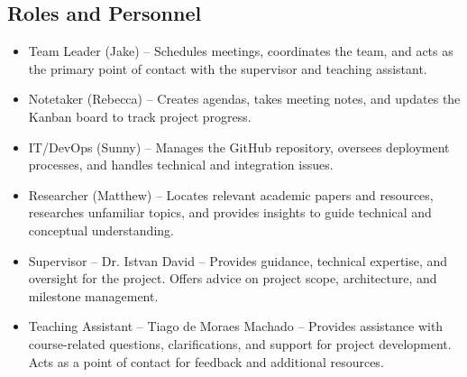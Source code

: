 \documentclass{article}
\begin{document}
\subsection{Roles and Personnel}\label{subsec:roles}
\begin{itemize}
    \item {Team Leader (Jake)} – Schedules meetings, coordinates the team, and acts as the primary point of contact with the supervisor and teaching assistant.
    \item {Notetaker (Rebecca)} – Creates agendas, takes meeting notes, and updates the Kanban board to track project progress.
    \item {IT/DevOps (Sunny)} – Manages the GitHub repository, oversees deployment processes, and handles technical and integration issues.
    \item {Researcher (Matthew)} – Locates relevant academic papers and resources, researches unfamiliar topics, and provides insights to guide technical and conceptual understanding.
    \item {Supervisor – Dr. Istvan David} – Provides guidance, technical expertise, and oversight for the project. Offers advice on project scope, architecture, and milestone management.
    \item {Teaching Assistant – Tiago de Moraes Machado} – Provides assistance with course-related questions, clarifications, and support for project development. Acts as a point of contact for feedback and additional resources.
\end{itemize}
\end{document}
